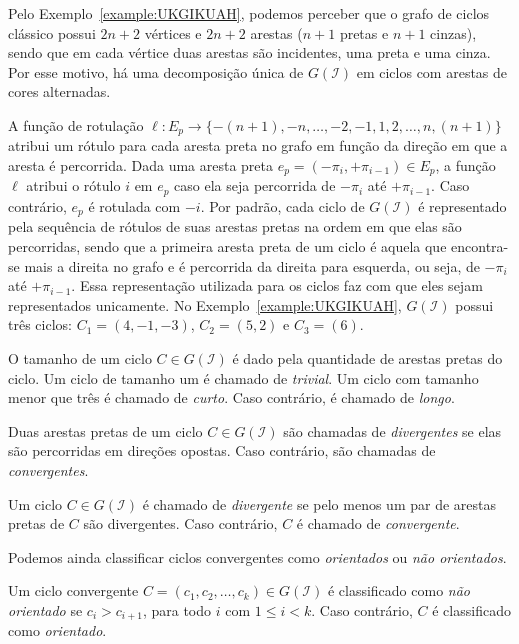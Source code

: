 

Pelo Exemplo~\ref{example:UKGIKUAH}, podemos perceber que o grafo de ciclos clássico possui $2n+2$ vértices e $2n+2$ arestas ($n+1$ pretas e $n+1$ cinzas), sendo que em cada vértice duas arestas são incidentes, uma preta e uma cinza. Por esse motivo, há uma decomposição única de $G(\mathcal{I})$ em ciclos com arestas de cores alternadas. 

A função de rotulação $\ell : E_p \rightarrow \{-(n+1),-n,\dots,-2,-1,1,2,\dots,n,(n+1)\}$ atribui um rótulo para cada aresta preta no grafo em função da direção em que a aresta é percorrida. Dada uma aresta preta $e_p = (-\pi_i, +\pi_{i-1}) \in E_p$, a função $\ell$ atribui o rótulo $i$ em $e_p$ caso ela seja percorrida de $-\pi_i$ até $+\pi_{i-1}$. Caso contrário, $e_p$ é rotulada com $-i$. Por padrão, cada ciclo de $G(\mathcal{I})$ é representado pela sequência de rótulos de suas arestas pretas na ordem em que elas são percorridas, sendo que a primeira aresta preta de um ciclo é aquela que encontra-se mais a direita no grafo e é percorrida da direita para esquerda, ou seja, de $-\pi_i$ até $+\pi_{i-1}$. Essa representação utilizada para os ciclos faz com que eles sejam representados unicamente. No Exemplo~\ref{example:UKGIKUAH}, $G(\mathcal{I})$ possui três ciclos: $C_1=(4,-1,-3)$, $C_2 = (5,2)$ e $C_3 = (6)$.

O tamanho de um ciclo $C\in G(\mathcal{I})$ é dado pela quantidade de arestas pretas do ciclo. Um ciclo de tamanho um é chamado de \emph{trivial}. Um ciclo com tamanho menor que três é chamado de \emph{curto}. Caso contrário, é chamado de \emph{longo}. 

\begin{definition}
Duas arestas pretas de um ciclo $C\in G(\mathcal{I})$ são chamadas de \emph{divergentes} se elas são percorridas em direções opostas. Caso contrário, são chamadas de \emph{convergentes}.
\end{definition}
\begin{definition}
Um ciclo $C\in G(\mathcal{I})$ é chamado de \emph{divergente} se pelo menos um par de arestas pretas de $C$ são divergentes. Caso contrário, $C$ é chamado de \emph{convergente}.
\end{definition}

Podemos ainda classificar ciclos convergentes como \emph{orientados} ou \emph{não orientados}. 

\begin{definition}
Um ciclo convergente $C = (c_1,c_2,\dots,c_k) \in G(\mathcal{I})$ é classificado como \emph{não orientado} se $c_i > c_{i+1}$, para todo $i$ com $1 \le i < k$. Caso contrário, $C$ é classificado como \emph{orientado}.
\end{definition}


